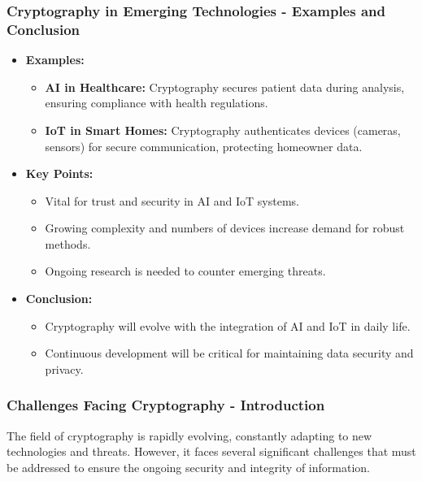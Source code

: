 \documentclass{beamer}
\begin{document}
\begin{frame}[fragile]
    \frametitle{Cryptography in Emerging Technologies - Examples and Conclusion}
    \begin{itemize}
        \item \textbf{Examples:}
            \begin{itemize}
                \item \textbf{AI in Healthcare:} Cryptography secures patient data during analysis, ensuring compliance with health regulations.
                \item \textbf{IoT in Smart Homes:} Cryptography authenticates devices (cameras, sensors) for secure communication, protecting homeowner data.
            \end{itemize}
        \item \textbf{Key Points:}
            \begin{itemize}
                \item Vital for trust and security in AI and IoT systems.
                \item Growing complexity and numbers of devices increase demand for robust methods.
                \item Ongoing research is needed to counter emerging threats.
            \end{itemize}
        \item \textbf{Conclusion:}
            \begin{itemize}
                \item Cryptography will evolve with the integration of AI and IoT in daily life.
                \item Continuous development will be critical for maintaining data security and privacy.
            \end{itemize}
    \end{itemize}
\end{frame}

\begin{frame}[fragile]
    \frametitle{Challenges Facing Cryptography - Introduction}
    The field of cryptography is rapidly evolving, constantly adapting to new technologies and threats. 
    However, it faces several significant challenges that must be addressed to ensure the ongoing security and integrity of information.
\end{frame}
\end{document}
